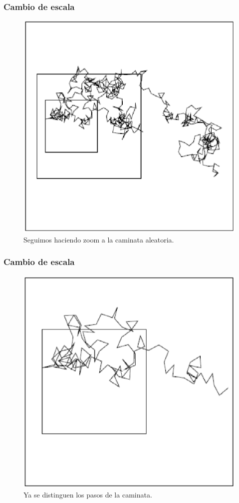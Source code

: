 \documentclass[12pt]{beamer}
\begin{document}
\begin{frame}
\frametitle{Cambio de escala}
\begin{figure}
	\centering
	\includegraphics[scale=0.5]{Imagenes/caminataAleatoria_04.eps}
	\caption{Seguimos haciendo zoom a la caminata aleatoria.}
\end{figure}
\end{frame}
\begin{frame}
\frametitle{Cambio de escala}
\begin{figure}
	\centering
	\includegraphics[scale=0.5]{Imagenes/caminataAleatoria_05.eps}
	\caption{Ya se distinguen los pasos de la caminata.}
\end{figure}
\end{frame}
\end{document}
